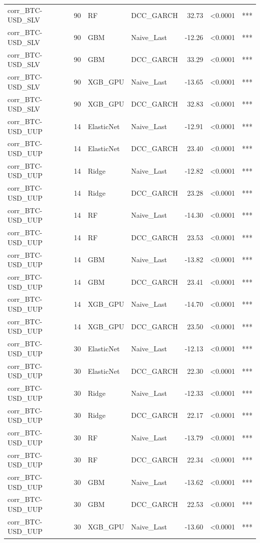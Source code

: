 \begin{table}[H]
\begin{tabular}{llllrrl}
corr_BTC-USD_SLV & 90 & RF & DCC_GARCH & 32.73 & <0.0001 & *** \\
corr_BTC-USD_SLV & 90 & GBM & Naive_Last & -12.26 & <0.0001 & *** \\
corr_BTC-USD_SLV & 90 & GBM & DCC_GARCH & 33.29 & <0.0001 & *** \\
corr_BTC-USD_SLV & 90 & XGB_GPU & Naive_Last & -13.65 & <0.0001 & *** \\
corr_BTC-USD_SLV & 90 & XGB_GPU & DCC_GARCH & 32.83 & <0.0001 & *** \\
corr_BTC-USD_UUP & 14 & ElasticNet & Naive_Last & -12.91 & <0.0001 & *** \\
corr_BTC-USD_UUP & 14 & ElasticNet & DCC_GARCH & 23.40 & <0.0001 & *** \\
corr_BTC-USD_UUP & 14 & Ridge & Naive_Last & -12.82 & <0.0001 & *** \\
corr_BTC-USD_UUP & 14 & Ridge & DCC_GARCH & 23.28 & <0.0001 & *** \\
corr_BTC-USD_UUP & 14 & RF & Naive_Last & -14.30 & <0.0001 & *** \\
corr_BTC-USD_UUP & 14 & RF & DCC_GARCH & 23.53 & <0.0001 & *** \\
corr_BTC-USD_UUP & 14 & GBM & Naive_Last & -13.82 & <0.0001 & *** \\
corr_BTC-USD_UUP & 14 & GBM & DCC_GARCH & 23.41 & <0.0001 & *** \\
corr_BTC-USD_UUP & 14 & XGB_GPU & Naive_Last & -14.70 & <0.0001 & *** \\
corr_BTC-USD_UUP & 14 & XGB_GPU & DCC_GARCH & 23.50 & <0.0001 & *** \\
corr_BTC-USD_UUP & 30 & ElasticNet & Naive_Last & -12.13 & <0.0001 & *** \\
corr_BTC-USD_UUP & 30 & ElasticNet & DCC_GARCH & 22.30 & <0.0001 & *** \\
corr_BTC-USD_UUP & 30 & Ridge & Naive_Last & -12.33 & <0.0001 & *** \\
corr_BTC-USD_UUP & 30 & Ridge & DCC_GARCH & 22.17 & <0.0001 & *** \\
corr_BTC-USD_UUP & 30 & RF & Naive_Last & -13.79 & <0.0001 & *** \\
corr_BTC-USD_UUP & 30 & RF & DCC_GARCH & 22.34 & <0.0001 & *** \\
corr_BTC-USD_UUP & 30 & GBM & Naive_Last & -13.62 & <0.0001 & *** \\
corr_BTC-USD_UUP & 30 & GBM & DCC_GARCH & 22.53 & <0.0001 & *** \\
corr_BTC-USD_UUP & 30 & XGB_GPU & Naive_Last & -13.60 & <0.0001 & *** \\

\end{tabular}
\end{table}
